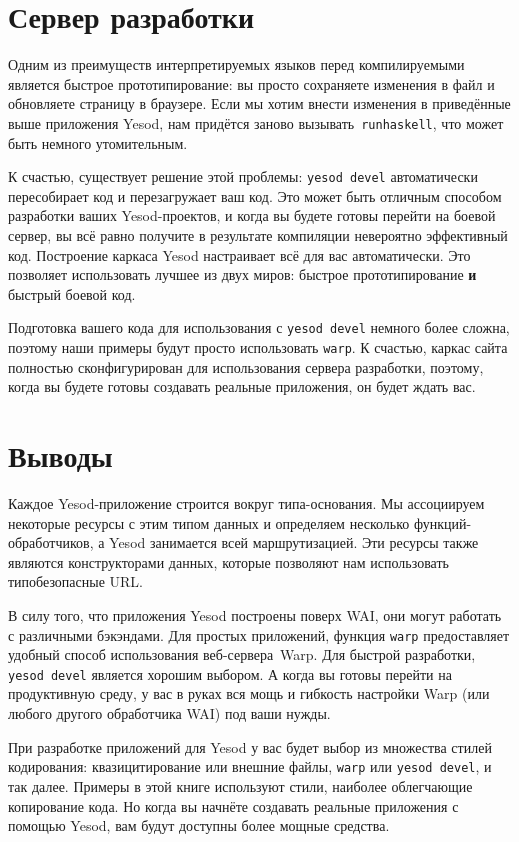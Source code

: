 \section{Сервер разработки}

Одним из преимуществ интерпретируемых языков перед компилируемыми является быстрое
прототипирование: вы просто сохраняете изменения в файл и обновляете страницу в
браузере. Если мы хотим внести изменения в приведённые выше приложения Yesod, нам придётся
заново вызывать~\texttt{runhaskell}, что может быть немного утомительным.

К счастью, существует решение этой проблемы: \texttt{yesod devel} автоматически
пересобирает код и перезагружает ваш код. Это может быть отличным способом разработки
ваших Yesod-проектов, и когда вы будете готовы перейти на боевой сервер, вы всё равно
получите в результате компиляции невероятно эффективный код. Построение каркаса Yesod
настраивает всё для вас автоматически. Это позволяет использовать лучшее из двух миров:
быстрое прототипирование \textbf{и} быстрый боевой код.

Подготовка вашего кода для использования с \texttt{yesod devel} немного более сложна,
поэтому наши примеры будут просто использовать \lstinline!warp!. К счастью,
каркас сайта полностью сконфигурирован для использования сервера разработки,
поэтому, когда вы будете готовы создавать реальные приложения, он будет ждать вас.

\section{Выводы}

Каждое Yesod-приложение строится вокруг типа-основания.  Мы ассоциируем некоторые ресурсы
с этим типом данных и определяем несколько функций-обработчиков, а Yesod занимается всей
маршрутизацией. Эти ресурсы также являются конструкторами данных, которые позволяют нам
использовать типобезопасные URL.

В силу того, что приложения Yesod построены поверх WAI, они могут работать с различными
бэкэндами. Для простых приложений, функция \lstinline{warp} предоставляет
удобный способ использования веб-сервера~Warp. Для быстрой разработки,
\texttt{yesod devel} является хорошим выбором. А когда вы готовы перейти на
продуктивную среду, у вас в руках вся мощь и гибкость настройки Warp (или
любого другого обработчика WAI) под ваши нужды.

При разработке приложений для Yesod у вас будет выбор из множества стилей кодирования:
квазицитирование или внешние файлы, \lstinline{warp} или \texttt{yesod devel}, и
так далее. Примеры в этой книге используют стили, наиболее облегчающие копирование кода. Но когда вы начнёте создавать реальные приложения с помощью
Yesod, вам будут доступны более мощные средства.

